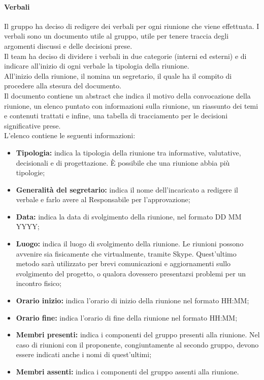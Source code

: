 			\paragraph{Verbali}
			Il gruppo ha deciso di redigere dei verbali per ogni riunione che viene effettuata. I verbali sono un documento utile al gruppo, utile per tenere traccia degli argomenti discussi e delle decisioni prese.\\
			Il team ha deciso di dividere i verbali in due categorie (interni ed esterni) e di indicare all'inizio di ogni verbale la tipologia della riunione.\\
			All'inizio della riunione, il \textit{\RdP} nomina un segretario, il quale ha il compito di procedere alla stesura del documento.\\
			Il documento contiene un abstract che indica il motivo della convocazione della riunione, un elenco puntato con informazioni sulla riunione, un riassunto dei temi e contenuti trattati e infine, una tabella di tracciamento per le decisioni significative prese.\\
			L'elenco contiene le seguenti informazioni:
			\begin{itemize}
				\item \textbf{Tipologia:} indica la tipologia della riunione tra informative, valutative, decisionali e di progettazione. \MakeUppercase{è} possibile che una riunione abbia più tipologie;
				\item \textbf{Generalità del segretario:} indica il nome dell'incaricato a redigere il verbale e farlo avere al Responsabile per l'approvazione;
				\item \textbf{Data:} indica la data di svolgimento della riunione, nel formato DD MM YYYY;
				\item \textbf{Luogo:} indica il luogo di svolgimento della riunione. Le riunioni possono avvenire sia fisicamente che virtualmente, tramite Skype. Quest'ultimo metodo sarà utilizzato per brevi comunicazioni e aggiornamenti sullo svolgimento del progetto, o qualora dovessero presentarsi problemi per un incontro fisico;
				\item \textbf{Orario inizio:} indica l'orario di inizio della riunione nel formato HH:MM;
				\item \textbf{Orario fine:} indica l'orario di fine della riunione nel formato HH:MM;
				\item \textbf{Membri presenti:} indica i componenti del gruppo presenti alla riunione. Nel caso di riunioni con il proponente, congiuntamente al secondo gruppo, devono essere indicati anche i nomi di quest'ultimi;
				\item \textbf{Membri assenti:} indica i componenti del gruppo assenti alla riunione.
			\end{itemize}
